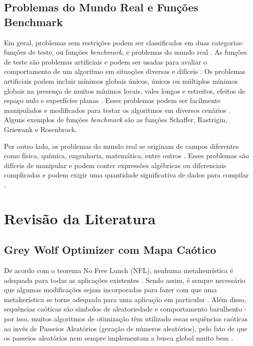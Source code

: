 \section{Problemas do Mundo Real e Funções Benchmark}

Em geral, problemas sem restrições podem ser classificados em duas categorias: funções de teste, ou funções \textit{benchmark}, e problemas do mundo real \cite{jamil}. As funções de teste são problemas artificiais e podem ser usadas para avaliar o comportamento de um algoritmo em situações diversas e difíceis \cite{jamil}. Os problemas artificiais podem incluir mínimos globais únicos, únicos ou múltiplos mínimos globais na presença de muitos mínimos locais, vales longos e estreitos, efeitos de espaço nulo e superfícies planas \cite{jamil}. Esses problemas podem ser facilmente manipulados e modificados para testar os algoritmos em diversos cenários \cite{jamil}. Alguns exemplos de funções \textit{benchmark} são as funções Schaffer, Rastrigin, Griewank e Rosenbrock. 

Por outro lado, os problemas do mundo real se originam de campos diferentes como física, química, engenharia, matemática, entre outros \cite{jamil}. Esses problemas são difíceis de manipular e podem conter expressões algébricas ou diferenciais complicadas e podem exigir uma quantidade significativa de dados para compilar \cite{jamil}. 

\chapter{Revisão da Literatura} \label{chap2}

\section{Grey Wolf Optimizer com Mapa Caótico}

De acordo com o teorema No Free Lunch (NFL), nenhuma metaheurística é adequada para todas as aplicações existentes \cite{saxena}. Sendo assim, é sempre necessário que algumas modificações sejam incorporadas para fazer com que uma metaherística se torne adequada para uma aplicação em particular \cite{saxena}. Além disso, sequências caóticas são símbolos de aleatoriedade e comportamento barulhento - por isso, muitos algoritmos de otimização têm utilizado essas sequências caóticas ao invés de Passeios Aleatórios (geração de números aleatórios), pelo fato de que os passeios aleatórios nem sempre implementam a busca global muito bem \cite{saxena}.

